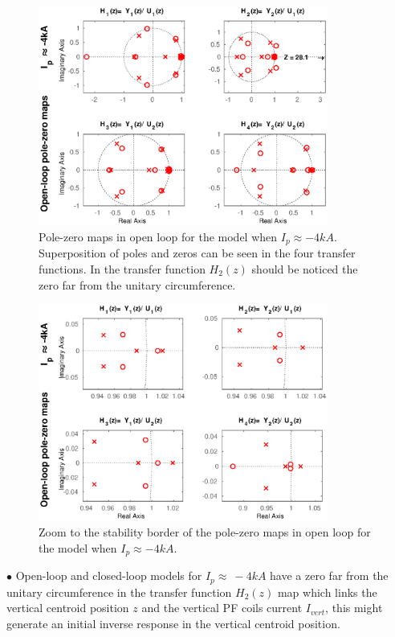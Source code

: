 \begin{figure}
	\centering
	\includegraphics[width=0.85\textwidth]{Chp5/PoleZero/PoleZeroOpenNeg.eps}
	\caption{  Pole-zero maps in open loop for the model when $I_p\approx -4 kA$. Superposition  of poles and zeros can be seen in the four transfer functions. In the transfer function $H_2(z)$ should be noticed the zero far from the unitary circumference. \label{PoleZeroOpenNeg}}
\end{figure}	

\begin{figure}
	\centering
	\includegraphics[width=0.85\textwidth]{Chp5/PoleZero/PoleZeroOpenNegZoom.eps}
\caption{Zoom to the stability border of the pole-zero maps in open loop for the model when $I_p\approx -4 kA$.	\label{PoleZeroOpenNegZoom}}
\end{figure}



$\bullet$ Open-loop and closed-loop models for $I_p\approx~-4kA$ have a zero far from the unitary circumference in the transfer function $H_2(z)$ map which links the vertical centroid position $z$ and the vertical PF coils current $I_{vert}$, this might generate an initial inverse response in the vertical centroid position.
\smallskip

